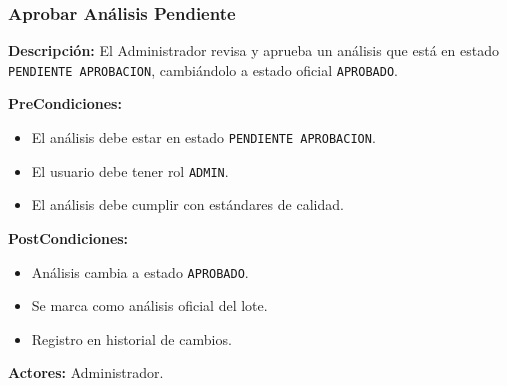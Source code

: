 \subsubsection{Aprobar Análisis Pendiente}

\textbf{Descripción:} El Administrador revisa y aprueba un análisis que está en estado \texttt{PENDIENTE APROBACION}, cambiándolo a estado oficial \texttt{APROBADO}.

\vspace{0.5em}
\noindent\textbf{PreCondiciones:}
\begin{itemize}[nosep]
    \item El análisis debe estar en estado \texttt{PENDIENTE APROBACION}.
    \item El usuario debe tener rol \texttt{ADMIN}.
    \item El análisis debe cumplir con estándares de calidad.
\end{itemize}

\vspace{0.5em}
\noindent\textbf{PostCondiciones:}
\begin{itemize}[nosep]
    \item Análisis cambia a estado \texttt{APROBADO}.
    \item Se marca como análisis oficial del lote.
    \item Registro en historial de cambios.
\end{itemize}

\vspace{0.5em}
\noindent\textbf{Actores:} Administrador.

